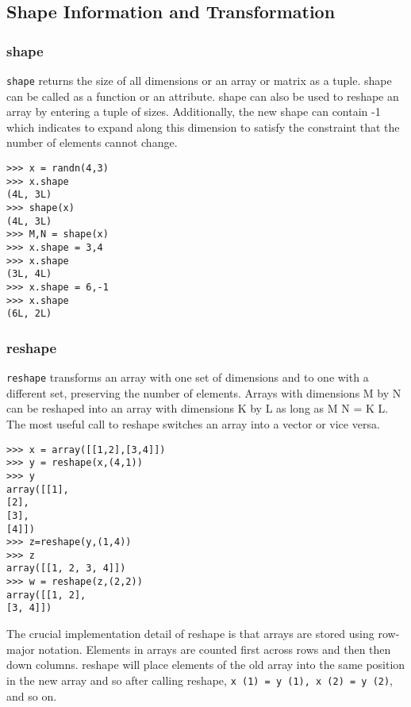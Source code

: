 \documentclass[KSmain.tex]{subfiles}
\begin{document}

\subsection{Shape Information and Transformation}

\subsubsection{shape}

\texttt{shape} returns the size of all dimensions or an array or matrix as a tuple. shape can be called as a function
or an attribute. shape can also be used to reshape an array by entering a tuple of sizes. Additionally, the
new shape can contain -1 which indicates to expand along this dimension to satisfy the constraint that
the number of elements cannot change.
\begin{framed}
\begin{verbatim}
>>> x = randn(4,3)
>>> x.shape
(4L, 3L)
>>> shape(x)
(4L, 3L)
>>> M,N = shape(x)
>>> x.shape = 3,4
>>> x.shape
(3L, 4L)
>>> x.shape = 6,-1
>>> x.shape
(6L, 2L)
\end{verbatim}
\end{framed}
\subsubsection{reshape}

\texttt{reshape}  transforms an array with one set of dimensions and to one with a different set, preserving the
number of elements. Arrays with dimensions M by N can be reshaped into an array with dimensions K
by L as long as M N = K L. The most useful call to reshape switches an array into a vector or vice versa.
\begin{framed}
\begin{verbatim}
>>> x = array([[1,2],[3,4]])
>>> y = reshape(x,(4,1))
>>> y
array([[1],
[2],
[3],
[4]])
>>> z=reshape(y,(1,4))
>>> z
array([[1, 2, 3, 4]])
>>> w = reshape(z,(2,2))
array([[1, 2],
[3, 4]])
\end{verbatim}
\end{framed}
The crucial implementation detail of reshape is that arrays are stored using row-major notation. Elements
in arrays are counted first across rows and then then down columns. reshape will place elements of the
old array into the same position in the new array and so after calling reshape, \texttt{x (1) = y (1), x (2) = y (2)},
and so on.
\end{document}
